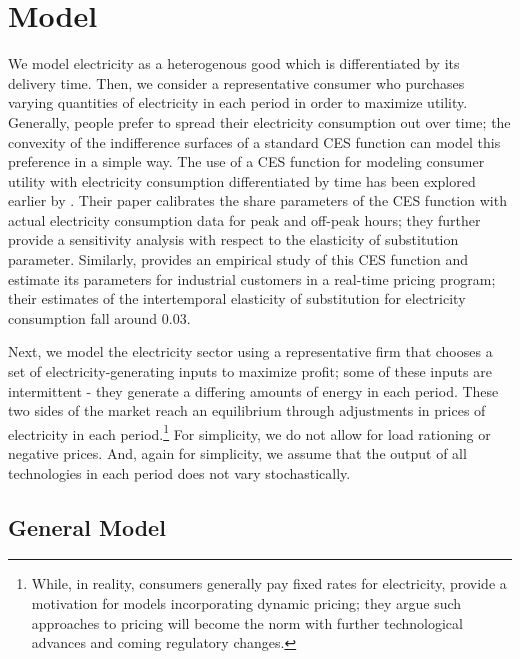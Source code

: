 \documentclass[11pt,a4paper]{extarticle}
\begin{document}



\section{Model}

We model electricity as a heterogenous good which is differentiated by its delivery time. Then, we consider a representative consumer who purchases varying quantities of electricity in each period in order to maximize utility. Generally, people prefer to spread their electricity consumption out over time; the convexity of the indifference surfaces of a standard CES function can model this preference in a simple way. The use of a CES function for modeling consumer utility with electricity consumption differentiated by time has been explored earlier by \citet{Moha2016}. Their paper calibrates the share parameters of the CES function with actual electricity consumption data for peak and off-peak hours; they further provide a sensitivity analysis with respect to the elasticity of substitution parameter. Similarly, \citet{Schwarz} provides an empirical study of this CES function and estimate its parameters for industrial customers in a real-time pricing program; their estimates of the intertemporal elasticity of substitution for electricity consumption fall around 0.03. 

Next, we model the electricity sector using a representative firm that chooses a set of electricity-generating inputs to maximize profit; some of these inputs are intermittent - they generate a differing amounts of energy in each period. These two sides of the market reach an equilibrium through adjustments in prices of electricity in each period.\footnote{While, in reality, consumers generally pay fixed rates for electricity, \citeauthor{HH} provide a motivation for models incorporating dynamic pricing; they argue such approaches to pricing will become the norm with further technological advances and coming regulatory changes. } For simplicity, we do not allow for load rationing  or negative prices. And, again for simplicity, we assume that the output of all technologies in each period does not vary stochastically. 

\subsection{General Model}
\end{document}
